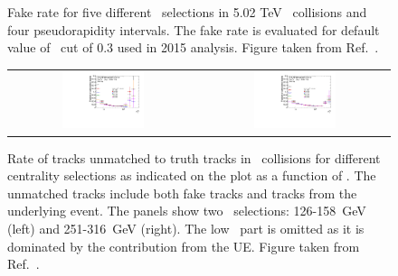 \begin{figure}
\begin{tabular}{cc}
\end{tabular}
\caption{Fake rate for five different \ptjet\ selections in 5.02 TeV \pp\ collisions and four pseudorapidity intervals.
The fake rate is evaluated for default value of \mcprob\ cut of 0.3 used in 2015 analysis.
Figure taken from Ref.~\cite{Sickles:2235420}.}
\label{fig:fakeratepp}
\end{figure}  

\begin{figure}
\centering
\begin{tabular}{cc}
\includegraphics[width=0.45\textwidth]{figures/main/corrections/fake_rate_pt_125GeV.pdf} &
\includegraphics[width=0.45\textwidth]{figures/main/corrections/fake_rate_pt_251GeV.pdf} \\
\end{tabular}
\caption{ Rate of tracks unmatched to truth tracks
in \pbpb\ collisions for different centrality selections as indicated on the plot as a function of \pttrk.
The unmatched tracks include both fake tracks and tracks from the underlying event.
The panels show two \ptjet\ selections: 126-158~GeV (left) and 251-316~GeV (right).
The low \pT\ part is omitted as it is dominated by the contribution from the UE.
Figure taken from Ref.~\cite{Sickles:2235420}.}
\label{fig:fakeratepbpb}
\end{figure}

